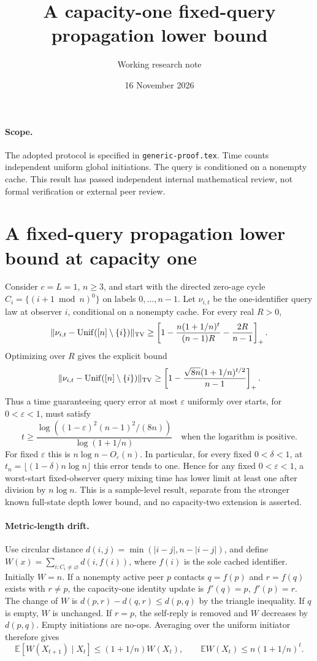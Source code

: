 \documentclass[11pt]{article}
\title{A capacity-one fixed-query propagation lower bound}
\author{Working research note}
\date{16 November 2026}
\begin{document}
\maketitle
\paragraph{Scope.} The adopted protocol is specified in
\texttt{generic-proof.tex}. Time counts independent uniform global
initiations. The query is conditioned on a nonempty cache. This result has
passed independent internal mathematical review, not formal verification
or external peer review.
\section{A fixed-query propagation lower bound at capacity one}
Consider $c=L=1$, $n\ge3$, and start with the directed zero-age cycle
$C_i=\{(i+1\bmod n)^0\}$ on labels $0,\ldots,n-1$. Let $\nu_{i,t}$ be the
one-identifier query law at observer $i$, conditional on a nonempty cache.
For every real $R>0$,
\[
 \|\nu_{i,t}-\operatorname{Unif}([n]\setminus\{i\})\|_{\rm TV}
 \ge\left[1-
 \frac{n(1+1/n)^t}{(n-1)R}-\frac{2R}{n-1}\right]_+.
\]
Optimizing over $R$ gives the explicit bound
\[
 \|\nu_{i,t}-\operatorname{Unif}([n]\setminus\{i\})\|_{\rm TV}
 \ge\left[1-\frac{\sqrt{8n}(1+1/n)^{t/2}}{n-1}\right]_+.
\]
Thus a time guaranteeing query error at most $\varepsilon$ uniformly
over starts, for $0<\varepsilon<1$, must satisfy
\[
 t\ge\frac{\log\!\left((1-\varepsilon)^2(n-1)^2/(8n)\right)}
 {\log(1+1/n)}
 \quad\text{when the logarithm is positive}.
\]
For fixed $\varepsilon$ this is $n\log n-O_\varepsilon(n)$.
In particular, for every fixed $0<\delta<1$, at
$t_n=\lfloor(1-\delta)n\log n\rfloor$ this error tends to one. Hence for
any fixed $0<\varepsilon<1$, a worst-start fixed-observer query mixing time
has lower limit at least one after division by $n\log n$. This is a
sample-level result, separate from the stronger known full-state depth
lower bound, and no capacity-two extension is asserted.

\paragraph{Metric-length drift.}
Use circular distance $d(i,j)=\min(|i-j|,n-|i-j|)$, and define
$W(x)=\sum_{i:C_i\ne\varnothing}d(i,f(i))$, where $f(i)$ is the sole cached
identifier. Initially $W=n$. If a nonempty active peer $p$ contacts
$q=f(p)$ and $r=f(q)$ exists with $r\ne p$, the capacity-one identity update
is $f'(q)=p$, $f'(p)=r$. The change of $W$ is
$d(p,r)-d(q,r)\le d(p,q)$ by the triangle inequality. If $q$ is empty,
$W$ is unchanged. If $r=p$, the self-reply is removed and $W$ decreases by
$d(p,q)$. Empty initiations are no-ops. Averaging over the uniform initiator
therefore gives
\[
 \mathbb E[W(X_{t+1})\mid X_t]\le(1+1/n)W(X_t),
 \qquad \mathbb EW(X_t)\le n(1+1/n)^t.
\]
\end{document}
